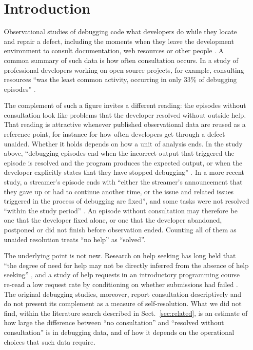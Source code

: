 \documentclass[pdflatex,sn-basic]{sn-jnl}
\begin{document}

\maketitle

\section{Introduction}\label{sec:intro}

Observational studies of debugging code what developers do while they locate and repair a defect, including the moments when they leave the development environment to consult documentation, web resources or other people \citep{alaboudi2021,alaboudi2023,li2026}. A common summary of such data is how often consultation occurs. In a study of professional developers working on open source projects, for example, consulting resources ``was the least common activity, occurring in only 33\% of debugging episodes'' \citep{alaboudi2023}.

The complement of such a figure invites a different reading: the episodes without consultation look like problems that the developer resolved without outside help. That reading is attractive whenever published observational data are reused as a reference point, for instance for how often developers get through a defect unaided. Whether it holds depends on how a unit of analysis ends. In the study above, ``debugging episodes end when the incorrect output that triggered the episode is resolved and the program produces the expected output, or when the developer explicitly states that they have stopped debugging'' \citep{alaboudi2023}. In a more recent study, a streamer's episode ends with ``either the streamer's announcement that they gave up or had to continue another time, or the issue and related issues triggered in the process of debugging are fixed'', and some tasks were not resolved ``within the study period'' \citep{li2026}. An episode without consultation may therefore be one that the developer fixed alone, or one that the developer abandoned, postponed or did not finish before observation ended. Counting all of them as unaided resolution treats ``no help'' as ``solved''.

The underlying point is not new. Research on help seeking has long held that ``the degree of need for help may not be directly inferred from the absence of help seeking'' \citep{karabenick2011}, and a study of help requests in an introductory programming course re-read a low request rate by conditioning on whether submissions had failed \citep{hellas2023}. The original debugging studies, moreover, report consultation descriptively and do not present its complement as a measure of self-resolution. What we did not find, within the literature search described in Sect.~\ref{sec:related}, is an estimate of how large the difference between ``no consultation'' and ``resolved without consultation'' is in debugging data, and of how it depends on the operational choices that such data require.
\end{document}
